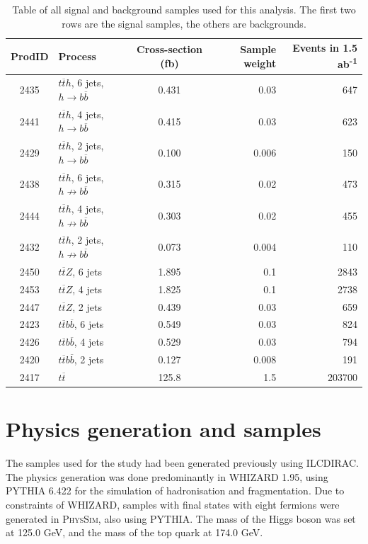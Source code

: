 \begin{table}[htp]
\centering
	\begin{tabular}{ c l c r r }
	\hline \hline
	\textbf{ProdID} & \textbf{Process} & \textbf{Cross-section (fb)} & \textbf{Sample weight} & \textbf{Events in 1.5 ab\textsuperscript{-1}} \\ \hline
	2435 & $t\overline{t}h$, 6 jets, $h \rightarrow b\overline{b}$ & 0.431 & 0.03 & 647 \\
	2441 & $t\overline{t}h$, 4 jets, $h \rightarrow b\overline{b}$ & 0.415 & 0.03 & 623 \\ \hline
	2429 & $t\overline{t}h$, 2 jets, $h \rightarrow b\overline{b}$ & 0.100 & 0.006 & 150 \\

	2438 & $t\overline{t}h$, 6 jets, $h \not\rightarrow b\overline{b}$ & 0.315 & 0.02 & 473	 \\
	2444 & $t\overline{t}h$, 4 jets, $h \not\rightarrow b\overline{b}$ & 0.303 & 0.02 & 455 \\
	2432 & $t\overline{t}h$, 2 jets, $h \not\rightarrow b\overline{b}$ & 0.073 & 0.004 & 110 \\

	2450 & $t\overline{t}Z$, 6 jets & 1.895 & 0.1 & 2843 \\
	2453 & $t\overline{t}Z$, 4 jets & 1.825 & 0.1 & 2738 \\
	2447 & $t\overline{t}Z$, 2 jets & 0.439 & 0.03 & 659 \\
	
	2423 & $t\overline{t}b\overline{b}$, 6 jets & 0.549 & 0.03 & 824 \\
	2426 & $t\overline{t}b\overline{b}$, 4 jets & 0.529 & 0.03 & 794 \\
	2420 & $t\overline{t}b\overline{b}$, 2 jets & 0.127 & 0.008 & 191 \\

	2417 & $t\overline{t}$ & 125.8 & 1.5 & 203700 \\ \hline \hline

	\end{tabular}
	\caption{Table of all signal and background samples used for this analysis. The first two rows are the signal samples, the others are backgrounds.}
	\label{table:physics/SM/generatedsamples}
\end{table}

\section{Physics generation and samples}
The samples used for the study had been generated previously using ILCDIRAC\cite{ilc-dirac}. The physics generation was done predominantly in WHIZARD 1.95\cite{whizard}, using PYTHIA 6.422\cite{pythia} for the simulation of hadronisation and fragmentation. Due to constraints of WHIZARD, samples with final states with eight fermions were generated in \textsc{PhysSim}, also using PYTHIA. The mass of the Higgs boson was set at 125.0 GeV, and the mass of the top quark at 174.0 GeV. 

